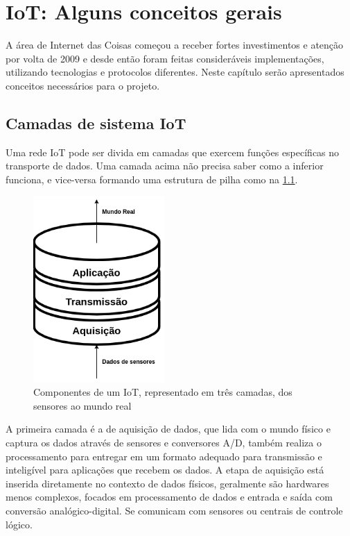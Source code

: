 \chapter{IoT: Alguns conceitos gerais}
\label{chapter:coneceitos}

A área de Internet das Coisas começou a receber fortes investimentos e atenção por volta de 2009 \cite{Rampim:iot} e desde então foram feitas consideráveis implementações, utilizando tecnologias e protocolos diferentes. Neste capítulo serão apresentados conceitos necessários para o projeto.

\section{Camadas de sistema IoT}
\label{section:camadas_iot}

Uma rede IoT pode ser divida em camadas que exercem funções específicas no transporte de dados. Uma camada acima não precisa saber como a inferior funciona, e vice-versa formando uma estrutura de pilha como na \ref{fig:1.2.0/camadas_iot}.

\begin{figure}[h!]
\centering
\includegraphics[width=5cm]{./02_Capitulos/02_Cap1/figures/iot_stack}
\caption{Componentes de um IoT, representado em três camadas, dos sensores ao mundo real}
\label{fig:1.2.0/camadas_iot}
\end{figure}

A primeira camada é a de aquisição de dados, que lida com o mundo físico e captura os dados através de sensores e conversores A/D, também realiza o processamento para entregar em um formato adequado para transmissão e inteligível para aplicações que recebem os dados. A etapa de aquisição está inserida diretamente no contexto de dados físicos, geralmente são hardwares menos complexos, focados em processamento de dados e entrada e saída com conversão analógico-digital. Se comunicam com sensores ou centrais de controle lógico.

